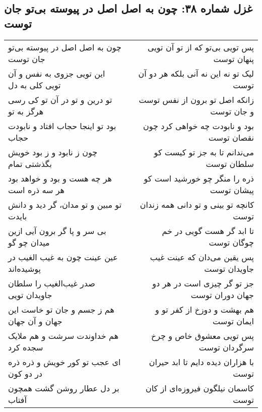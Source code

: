 \begin{center}
\section*{غزل شماره ۳۸: چون به اصل اصل در پیوسته بی‌تو جان توست}
\label{sec:038}
\begin{longtable}{l p{0.5cm} r}
چون به اصل اصل در پیوسته بی‌تو جان توست
&&
پس تویی بی‌تو که از تو آن تویی پنهان توست
\\
این تویی جزوی به نفس و آن تویی کلی به دل
&&
لیک تو نه این نه آنی بلکه هر دو آن توست
\\
تو درین و تو در آن تو کی رسی هرگز به تو
&&
زانکه اصل تو برون از نفس توست و جان توست
\\
بود تو اینجا حجاب افتاد و نابودت حجاب
&&
بود و نابودت چه خواهی کرد چون نقصان توست
\\
چون ز نابود و ز بود خویش بگذشتی تمام
&&
می‌ندانم تا به جز تو کیست کو سلطان توست
\\
هر چه هست و بود و خواهد بود هر سه ذره است
&&
ذره را منگر چو خورشید است کو پیشان توست
\\
تو مبین و تو مدان، گر دید و دانش بایدت
&&
کانچه تو بینی و تو دانی همه زندان توست
\\
بی سر و پا گر برون آیی ازین میدان چو گو
&&
تا ابد گر هست گویی در خم چوگان توست
\\
عین عینت چون به غیب الغیب در پوشیده‌اند
&&
پس یقین می‌دان که عینت غیب جاویدان توست
\\
صدر غیب‌الغیب را سلطان جاویدان تویی
&&
جز تو گر چیزی است در هر دو جهان دوران توست
\\
هم ز جسم و جان تو خاست این جهان و آن جهان
&&
هم بهشت و دوزخ از کفر تو و ایمان توست
\\
هم خداوندت سرشت و هم ملایک سجده کرد
&&
پس تویی معشوق خاص و چرخ سرگردان توست
\\
ای عجب تو کور خویش و ذره ذره در دو کون
&&
با هزاران دیده دایم تا ابد حیران توست
\\
بر دل عطار روشن گشت همچون آفتاب
&&
کاسمان نیلگون فیروزه‌ای از کان توست
\\
\end{longtable}
\end{center}
